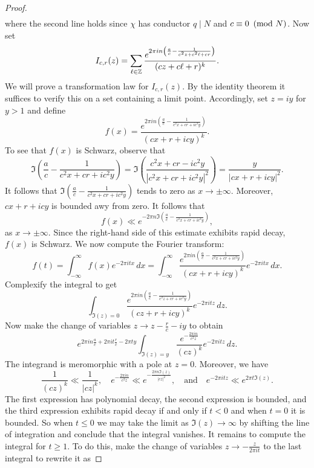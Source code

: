\begin{proof}
\begin{align*}
      \end{align*}
      where the second line holds since $\chi$ has conductor $q \mid N$ and $c \equiv 0 \ \left(\text{mod }N\right)$. Now set
      \[
        I_{c,r}(z) = \sum_{\ell \in \mathbb{Z}}\frac{e^{2\pi in\left(\frac{a}{c}-\frac{1}{c^{2}z+c^{2}\ell+cr}\right)}}{(cz+c\ell+r)^{k}}.
      \]
      We will prove a transformation law for $I_{c,r}(z)$. By the identity theorem it suffices to verify this on a set containing a limit point. Accordingly, set $z = iy$ for $y > 1$ and define
      \[
        f(x) = \frac{e^{2\pi in\left(\frac{a}{c}-\frac{1}{c^{2}x+cr+ic^{2}y}\right)}}{(cx+r+icy)^{k}}.
      \]
      To see that $f(x)$ is Schwarz, observe that
      \[
        \Im\left(\frac{a}{c}-\frac{1}{c^{2}x+cr+ic^{2}y}\right) = \Im\left(\frac{c^{2}x+cr-ic^{2}y}{|c^{2}x+cr+ic^{2}y|^{2}}\right) = \frac{y}{|cx+r+icy|^{2}}.
      \]
      It follows that $\Im\left(\frac{a}{c}-\frac{1}{c^{2}x+cr+ic^{2}y}\right)$ tends to zero as $x \to \pm\infty$. Moreover, $cx+r+icy$ is bounded awy from zero. It follows that
      \[
        f(x) \ll e^{-2\pi n\Im\left(\frac{a}{c}-\frac{1}{c^{2}x+cr+ic^{2}y}\right)},
      \]
      as $x \to \pm\infty$. Since the right-hand side of this estimate exhibits rapid decay, $f(x)$ is Schwarz. We now compute the Fourier transform:
      \[
        \hat{f}(t) = \int_{-\infty}^{\infty}f(x)e^{-2\pi itx}\,dx = \int_{-\infty}^{\infty}\frac{e^{2\pi in\left(\frac{a}{c}-\frac{1}{c^{2}x+cr+ic^{2}y}\right)}}{(cx+r+icy)^{k}}e^{-2\pi itx}\,dx.
      \]
      Complexify the integral to get
      \[
        \int_{\Im(z) = 0}\frac{e^{2\pi in\left(\frac{a}{c}-\frac{1}{c^{2}z+cr+ic^{2}y}\right)}}{(cz+r+icy)^{k}}e^{-2\pi itz}\,dz.
      \]
      Now make the change of variables $z \to z-\frac{r}{c}-iy$ to obtain
      \[
        e^{2\pi in\frac{a}{c}+2\pi it\frac{r}{c}-2\pi ty}\int_{\Im(z) = y}\frac{e^{-\frac{2\pi in}{c^{2}z}}}{(cz)^{k}}e^{-2\pi itz}\,dz.
      \]
      The integrand is meromorphic with a pole at $z = 0$. Moreover, we have
      \[
        \frac{1}{(cz)^{k}} \ll \frac{1}{|cz|^{k}}, \quad e^{-\frac{2\pi in}{c^{2}z}} \ll e^{-\frac{2\pi n\Im(z)}{|cz|^{2}}}, \quad \text{and} \quad e^{-2\pi itz} \ll e^{2\pi t\Im(z)}.
      \]
      The first expression has polynomial decay, the second expression is bounded, and the third expression exhibits rapid decay if and only if $t < 0$ and when $t = 0$ it is bounded. So when $t \le 0$ we may take the limit as $\Im(z) \to \infty$  by shifting the line of integration and conclude that the integral vanishes. It remains to compute the integral for $t \ge 1$. To do this, make the change of variables $z \to -\frac{z}{2\pi it}$ to the last integral to rewrite it as

\end{proof}
